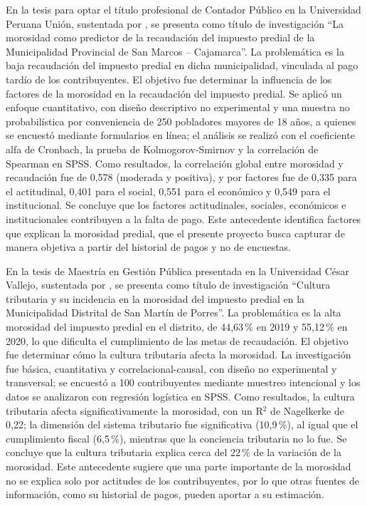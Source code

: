 \documentclass[12pt,a4paper]{report}
\begin{document}
En la tesis para optar el título profesional de Contador Público en la Universidad Peruana Unión, sustentada por \textcite{campos2024}, se presenta como título de investigación ``La morosidad como predictor de la recaudación del impuesto predial de la Municipalidad Provincial de San Marcos -- Cajamarca''. La problemática es la baja recaudación del impuesto predial en dicha municipalidad, vinculada al pago tardío de los contribuyentes. El objetivo fue determinar la influencia de los factores de la morosidad en la recaudación del impuesto predial. Se aplicó un enfoque cuantitativo, con diseño descriptivo no experimental y una muestra no probabilística por conveniencia de 250 pobladores mayores de 18 años, a quienes se encuestó mediante formularios en línea; el análisis se realizó con el coeficiente alfa de Cronbach, la prueba de Kolmogorov-Smirnov y la correlación de Spearman en SPSS. Como resultados, la correlación global entre morosidad y recaudación fue de 0,578 (moderada y positiva), y por factores fue de 0,335 para el actitudinal, 0,401 para el social, 0,551 para el económico y 0,549 para el institucional. Se concluye que los factores actitudinales, sociales, económicos e institucionales contribuyen a la falta de pago. Este antecedente identifica factores que explican la morosidad predial, que el presente proyecto busca capturar de manera objetiva a partir del historial de pagos y no de encuestas.

En la tesis de Maestría en Gestión Pública presentada en la Universidad César Vallejo, sustentada por \textcite{paredes2022}, se presenta como título de investigación ``Cultura tributaria y su incidencia en la morosidad del impuesto predial en la Municipalidad Distrital de San Martín de Porres''. La problemática es la alta morosidad del impuesto predial en el distrito, de 44,63\,\% en 2019 y 55,12\,\% en 2020, lo que dificulta el cumplimiento de las metas de recaudación. El objetivo fue determinar cómo la cultura tributaria afecta la morosidad. La investigación fue básica, cuantitativa y correlacional-causal, con diseño no experimental y transversal; se encuestó a 100 contribuyentes mediante muestreo intencional y los datos se analizaron con regresión logística en SPSS. Como resultados, la cultura tributaria afecta significativamente la morosidad, con un R$^2$ de Nagelkerke de 0,22; la dimensión del sistema tributario fue significativa (10,9\,\%), al igual que el cumplimiento fiscal (6,5\,\%), mientras que la conciencia tributaria no lo fue. Se concluye que la cultura tributaria explica cerca del 22\,\% de la variación de la morosidad. Este antecedente sugiere que una parte importante de la morosidad no se explica solo por actitudes de los contribuyentes, por lo que otras fuentes de información, como su historial de pagos, pueden aportar a su estimación.
\end{document}
